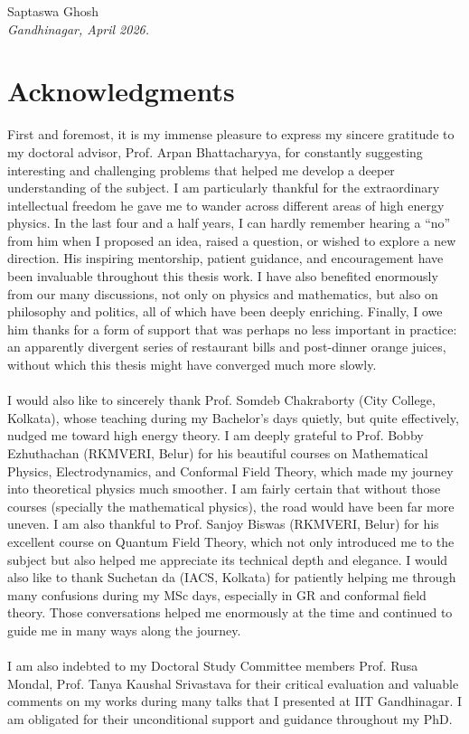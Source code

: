 \documentclass[11pt,a4paper,oneside]{book}
\newcommand{\frontchapter}[1]{%
  \chapter*{#1}%
  \addcontentsline{toc}{chapter}{#1}%
}
\begin{document}

\vfill
\begin{flushright}
Saptaswa Ghosh\\
\textit{Gandhinagar, April 2026.}
\end{flushright}
\frontchapter{Acknowledgments}
 First and foremost, it is my immense pleasure to express my sincere gratitude to my doctoral advisor, Prof. Arpan Bhattacharyya, for constantly suggesting interesting and challenging problems that helped me develop a deeper understanding of the subject. I am particularly thankful for the extraordinary intellectual freedom he gave me to wander across different areas of high energy physics. In the last four and a half years, I can hardly remember hearing a ``no'' from him when I proposed an idea, raised a question, or wished to explore a new direction. His inspiring mentorship, patient guidance, and  encouragement have been invaluable throughout this thesis work.
I have also benefited enormously from our many discussions, not only on physics and mathematics, but also on philosophy and politics, all of which have been deeply enriching. Finally, I owe him thanks for a form of support that was perhaps no less important in practice: an apparently divergent series of restaurant bills and post-dinner orange juices, without which this thesis might have converged much more slowly.\\\\
I would also like to sincerely thank Prof. Somdeb Chakraborty (City College, Kolkata), whose teaching during my Bachelor's days quietly, but quite effectively, nudged me toward high energy theory. I am deeply grateful to Prof. Bobby Ezhuthachan (RKMVERI, Belur) for his beautiful courses on Mathematical Physics, Electrodynamics, and Conformal Field Theory, which made my journey into theoretical physics much smoother. I am fairly certain that without those courses (specially the mathematical physics), the road would have been far more uneven. I am also thankful to Prof. Sanjoy Biswas (RKMVERI, Belur) for his excellent course on Quantum Field Theory, which not only introduced me to the subject but also helped me appreciate its technical depth and elegance. I would also like to thank Suchetan da (IACS, Kolkata) for patiently helping me through many confusions during my MSc days, especially in GR and conformal field theory. Those conversations helped me enormously at the time and continued to guide me in many ways along the journey.\\\\
I am also indebted to my Doctoral Study Committee members Prof. Rusa Mondal, Prof. Tanya Kaushal Srivastava for their critical evaluation and valuable comments on my works during many talks that I presented at IIT Gandhinagar. I am obligated for their unconditional support and guidance throughout my PhD.\\\\
\end{document}
